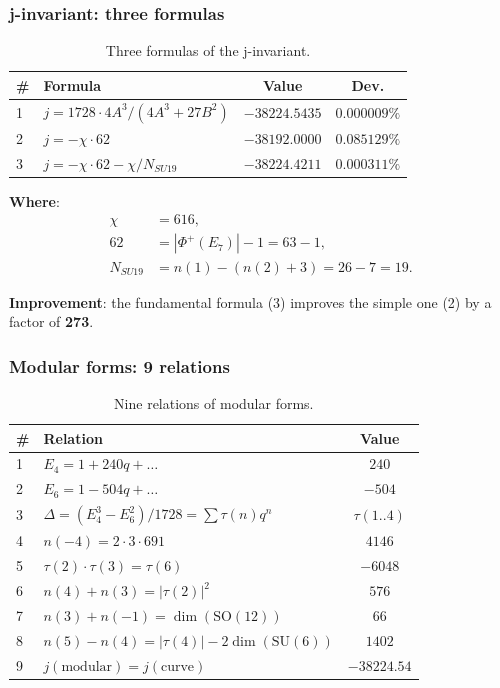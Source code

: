 \documentclass[11pt,a4paper]{article}
\newcommand{\SU}{\ensuremath{\mathrm{SU}}}
\newcommand{\SO}{\ensuremath{\mathrm{SO}}}
\theoremstyle{definition}
\begin{document}
\subsubsection{j-invariant: three formulas}

\begin{table}[ht]
\centering
\caption{Three formulas of the j-invariant.}
\label{tab:app-j-invariant}
\begin{tabular}{llcc}
\toprule
\# & Formula & Value & Dev. \\
\midrule
1 & $j = 1728 \cdot 4A^3/(4A^3 + 27B^2)$ & $-38224.5435$ & $0.000009\%$ \\
2 & $j = -\chi \cdot 62$ & $-38192.0000$ & $0.085129\%$ \\
3 & $j = -\chi \cdot 62 - \chi/N_{SU19}$ & $-38224.4211$ & $\mathbf{0.000311\%}$ \\
\bottomrule
\end{tabular}
\end{table}

\noindent
\textbf{Where}:
\begin{align}
    \chi &= 616, \\
    62 &= |\Phi^+(E_7)| - 1 = 63 - 1, \\
    N_{SU19} &= n(1) - (n(2) + 3) = 26 - 7 = 19.
\end{align}

\noindent
\textbf{Improvement}: the fundamental formula (3) improves the simple one (2)
by a factor of \textbf{273}.


\subsubsection{Modular forms: 9 relations}

\begin{table}[ht]
\centering
\caption{Nine relations of modular forms.}
\label{tab:app-modular-9}
\begin{tabular}{llc}
\toprule
\# & Relation & Value \\
\midrule
1 & $E_4 = 1 + 240 q + \ldots$ & $240$ \\
2 & $E_6 = 1 - 504 q + \ldots$ & $-504$ \\
3 & $\Delta = (E_4^3 - E_6^2)/1728 = \sum \tau(n) q^n$ & $\tau(1..4)$ \\
4 & $n(-4) = 2 \cdot 3 \cdot 691$ & $4146$ \\
5 & $\tau(2) \cdot \tau(3) = \tau(6)$ & $-6048$ \\
6 & $n(4) + n(3) = |\tau(2)|^2$ & $576$ \\
7 & $n(3) + n(-1) = \dim(\SO(12))$ & $66$ \\
8 & $n(5) - n(4) = |\tau(4)| - 2\dim(\SU(6))$ & $1402$ \\
9 & $j(\text{modular}) = j(\text{curve})$ & $-38224.54$ \\
\bottomrule
\end{tabular}
\end{table}
\end{document}
